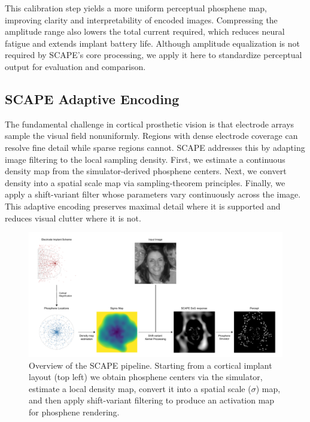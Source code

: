 This calibration step yields a more uniform perceptual phosphene map, improving clarity and interpretability of encoded images. Compressing the amplitude range also lowers the total current required, which reduces neural fatigue and extends implant battery life. Although amplitude equalization is not required by SCAPE’s core processing, we apply it here to standardize perceptual output for evaluation and comparison.



\subsection{SCAPE Adaptive Encoding}

The fundamental challenge in cortical prosthetic vision is that electrode arrays sample the visual field nonuniformly. Regions with dense electrode coverage can resolve fine detail while sparse regions cannot. SCAPE addresses this by adapting image filtering to the local sampling density. First, we estimate a continuous density map from the simulator-derived phosphene centers. Next, we convert density into a spatial scale map via sampling-theorem principles. Finally, we apply a shift-variant filter whose parameters vary continuously across the image. This adaptive encoding preserves maximal detail where it is supported and reduces visual clutter where it is not.

\begin{figure}[ht]
  \centering
  \includegraphics[width=\textwidth]{figures/SCAPElandscapeblack.pdf}
  \caption{Overview of the SCAPE pipeline. Starting from a cortical implant layout (top left) we obtain phosphene centers via the simulator, estimate a local density map, convert it into a spatial scale ($\sigma$) map, and then apply shift-variant filtering to produce an activation map for phosphene rendering.}
  \label{fig:scape_pipeline}
\end{figure}

